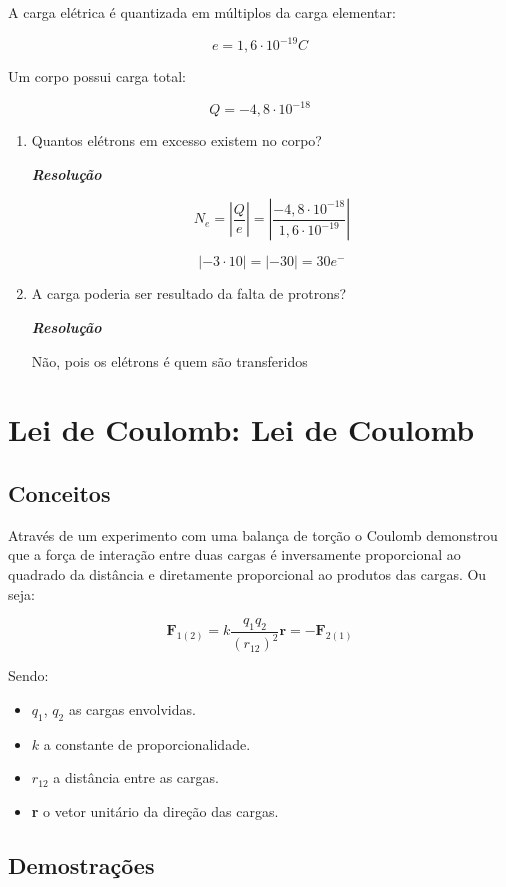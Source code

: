 \documentclass[a4paper, 12pt]{article}
\begin{document}
	A carga elétrica é quantizada em múltiplos da carga elementar:
	
	$$e=1,6\cdot 10^{-19}C$$
	
	Um corpo possui carga total:
	
	$$Q=-4,8\cdot 10^{-18}$$
	
	\begin{enumerate}[label=\alph*)]
		\item Quantos elétrons em excesso existem no corpo?
		
		\textit{\textbf{Resolução}}
		
		$$N_e=\left|\frac{Q}{e}\right|=\left|\frac{-4,8\cdot 10^{-18}}{1,6\cdot 10^{-19}}\right|$$
		
		$$\left|-3\cdot 10\right|=\left|-30\right|=30e^-$$
		
		\item A carga poderia ser resultado da falta de protrons?
		
		\textit{\textbf{Resolução}}
		
		Não, pois os elétrons é quem são transferidos
	\end{enumerate}
	
	\section{Lei de Coulomb: Lei de Coulomb}
	
	\subsection{Conceitos}
	
	
	Através de um experimento com uma balança de torção o Coulomb demonstrou que a força de interação entre duas cargas é inversamente proporcional ao quadrado da distância e diretamente proporcional ao produtos das cargas. Ou seja:
	
	$$\textbf{F}_{1(2)}=k\frac{q_1 q_2}{(r_{12})^2}\textbf{{r}}=-\textbf{F}_{2(1)}$$
	
	Sendo:
	
	\begin{itemize}
		\item $q_1$, $q_2$ as cargas envolvidas.
		\item $k$ a constante de proporcionalidade.
		\item $r_{12}$ a distância entre as cargas.
		\item \textbf{r} o vetor unitário da direção das cargas.
	\end{itemize}
	\subsection{Demostrações}
	
\end{document}
